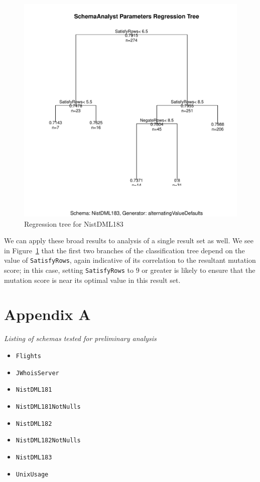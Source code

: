 \documentclass[a4paper,twocolumn]{article}
\begin{document}

\begin{figure}[t]
\begin{center}
\includegraphics[width=0.90\columnwidth]{NistDML183-regressiontree.pdf}
\caption{Regression tree for NistDML183}
\end{center}
\label{fig:CART}
\end{figure}

We can apply these broad results to analysis of a single result set as well. We see in Figure~\ref{fig:CART} that the first two branches of the classification tree depend on the value of \texttt{SatisfyRows}, again indicative of its correlation to the resultant mutation score; in this case, setting \texttt{SatisfyRows} to $9$ or greater is likely to ensure that the mutation score is near its optimal value in this result set.





\pagebreak

\section*{Appendix A} \label{appA}
\textit{Listing of schemas tested for preliminary analysis}
\begin{itemize}
\item \texttt{Flights}
\item \texttt{JWhoisServer}
\item \texttt{NistDML181}
\item \texttt{NistDML181NotNulls}
\item \texttt{NistDML182}
\item \texttt{NistDML182NotNulls}
\item \texttt{NistDML183}
\item \texttt{UnixUsage}
\end{itemize}
\end{document}

